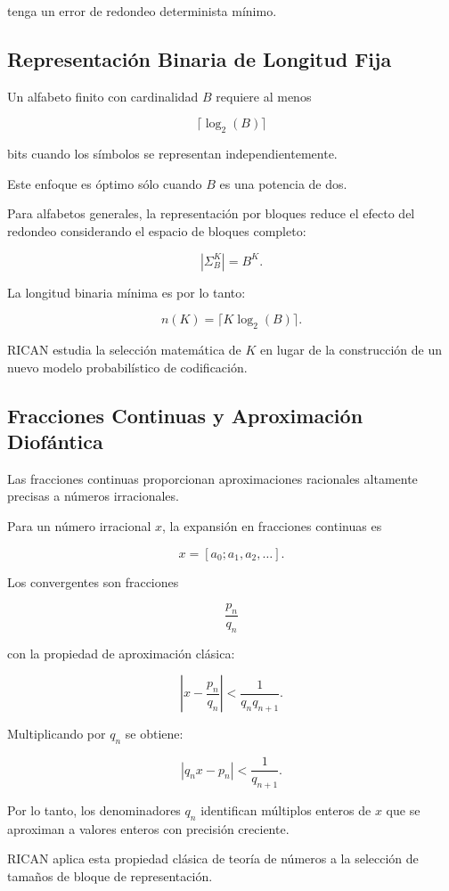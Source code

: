 \documentclass[onecolumn]{IEEEtran}
\begin{document}
tenga un error de redondeo determinista mínimo.

\subsection{Representación Binaria de Longitud Fija}

Un alfabeto finito con cardinalidad $B$ requiere al menos

\[
\lceil\log_2(B)\rceil
\]

bits cuando los símbolos se representan independientemente.

Este enfoque es óptimo sólo cuando $B$ es una potencia de dos.

Para alfabetos generales, la representación por bloques reduce el
efecto del redondeo considerando el espacio de bloques completo:

\[
|\Sigma_B^K|=B^K .
\]

La longitud binaria mínima es por lo tanto:

\[
n(K)=\lceil K\log_2(B)\rceil .
\]

RICAN estudia la selección matemática de $K$ en lugar de la
construcción de un nuevo modelo probabilístico de codificación.

\subsection{Fracciones Continuas y Aproximación Diofántica}

Las fracciones continuas proporcionan aproximaciones racionales
altamente precisas a números irracionales.

Para un número irracional $x$, la expansión en fracciones continuas es

\[
x=[a_0;a_1,a_2,\ldots].
\]

Los convergentes son fracciones

\[
\frac{p_n}{q_n}
\]

con la propiedad de aproximación clásica:

\[
\left|
x-\frac{p_n}{q_n}
\right|
<
\frac{1}{q_nq_{n+1}} .
\]

Multiplicando por $q_n$ se obtiene:

\[
|q_nx-p_n|
<
\frac{1}{q_{n+1}} .
\]

Por lo tanto, los denominadores $q_n$ identifican múltiplos enteros de
$x$ que se aproximan a valores enteros con precisión creciente.

RICAN aplica esta propiedad clásica de teoría de números a la
selección de tamaños de bloque de representación.
\end{document}
